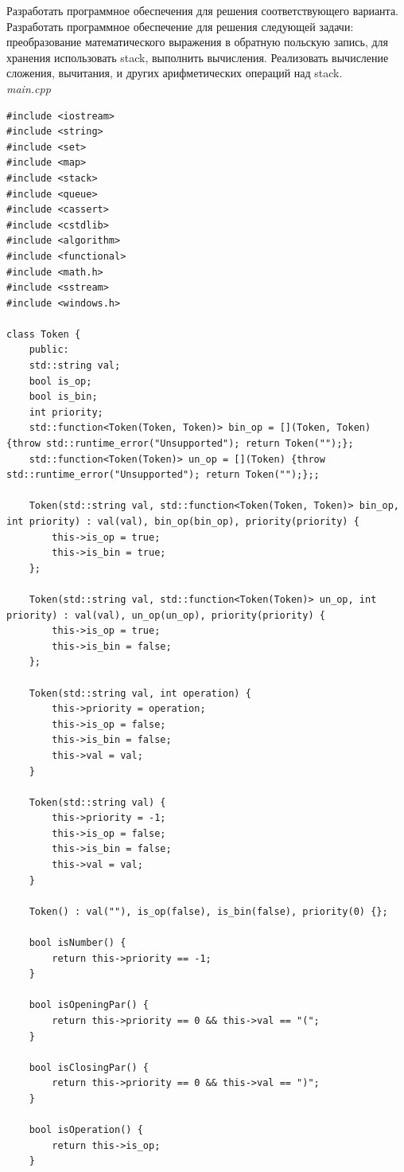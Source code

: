 \documentclass[a4paper,14pt]{extarticle}
\begin{document}
Разработать программное обеспечения для решения
соответствующего варианта.\\
Разработать программное обеспечение для решения следующей
задачи: преобразование математического выражения в обратную польскую
запись, для хранения использовать stack, выполнить вычисления.
Реализовать вычисление сложения, вычитания, и других арифметических
операций над stack.\\
\textit{main.cpp}
\begin{verbatim}
#include <iostream>
#include <string>
#include <set>
#include <map>
#include <stack>
#include <queue>
#include <cassert>
#include <cstdlib>
#include <algorithm>
#include <functional>
#include <math.h>
#include <sstream>
#include <windows.h>

class Token {
    public:
    std::string val;
    bool is_op;
    bool is_bin;
    int priority;
    std::function<Token(Token, Token)> bin_op = [](Token, Token) {throw std::runtime_error("Unsupported"); return Token("");};
    std::function<Token(Token)> un_op = [](Token) {throw std::runtime_error("Unsupported"); return Token("");};;

    Token(std::string val, std::function<Token(Token, Token)> bin_op, int priority) : val(val), bin_op(bin_op), priority(priority) {
        this->is_op = true;
        this->is_bin = true;
    };

    Token(std::string val, std::function<Token(Token)> un_op, int priority) : val(val), un_op(un_op), priority(priority) {
        this->is_op = true;
        this->is_bin = false;
    };

    Token(std::string val, int operation) {
        this->priority = operation;
        this->is_op = false;
        this->is_bin = false;
        this->val = val;
    }

    Token(std::string val) {
        this->priority = -1;
        this->is_op = false;
        this->is_bin = false;
        this->val = val;
    }

    Token() : val(""), is_op(false), is_bin(false), priority(0) {};

    bool isNumber() {
        return this->priority == -1;
    }

    bool isOpeningPar() {
        return this->priority == 0 && this->val == "(";
    }

    bool isClosingPar() {
        return this->priority == 0 && this->val == ")";
    }

    bool isOperation() {
        return this->is_op;
    }


\end{verbatim}
\end{document}
